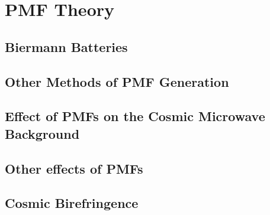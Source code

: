 \section{PMF Theory}

\iffalse
Observations of Faraday rotation in the polarisation of radio signals reveal the existence of weak coherent magnetic fields over large scales. Magnetic fields have strengths of order microgauss coherent over kPc scales. Similarly the intracluster medium possesses microgauss fields over tens of kPc. In addition, the voids between galaxy clusters are believed to have coherent nanogauss fields.
\\\\
The origin of these fields is not explained in $\Lambda$CDM cosmology. [why]. A solution to this problem are seed magnetic fields produced early in the Universe. These seed fields would be amplified through galactic dynamos and magnetohydrodynamics into the magnetic fields we observe in the present day.
\\\\
Primordial Magnetic Fields (PMFs) are a candidate for the seed magnetic fields. PMFs would have been produced during the early Universe. They may have been a result of conformal symmetry breaking during inflation, or during a phase transition - QCD to weak, say. The Biermann battery is the most standard mechanism for PMF production.
\fi
\subsection{Biermann Batteries}
\subsection{Other Methods of PMF Generation}
\subsection{Effect of PMFs on the Cosmic Microwave Background}
\subsection{Other effects of PMFs}
\subsection{Cosmic Birefringence}

